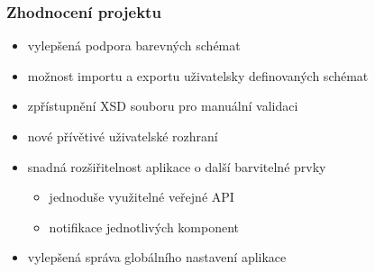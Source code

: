 \documentclass[slovak]{beamer}
\begin{document}
\begin{frame}
\frametitle{Zhodnocení projektu}
	\begin{itemize}
		\item vylepšená podpora barevných schémat
		\item možnost importu a exportu uživatelsky definovaných schémat
		\item zpřístupnění XSD souboru pro manuální validaci
		\item nové přívětivé uživatelské rozhraní
		\item snadná rozšiřitelnost aplikace o další barvitelné prvky
		\begin{itemize}
			\item jednoduše využitelné veřejné API
			\item notifikace jednotlivých komponent
		\end{itemize}
		\item vylepšená správa globálního nastavení aplikace
	\end{itemize}
\end{frame}
\end{document}
